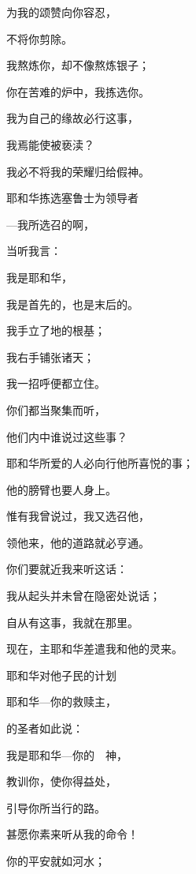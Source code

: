 {\par }{\Q 为我的颂赞向你容忍，
\par }{\Q 不将你剪除。
\par }{\Q {}我熬炼你，却不像熬炼银子；
\par }{\Q 你在苦难的炉中，我拣选你。
\par }{\Q {}我为自己的缘故必行这事，
\par }{\Q 我焉能使{}被亵渎？
\par }{\Q 我必不将我的荣耀归给假神。
\par }{\SH 耶和华拣选塞鲁士为领导者
\par }{\Q {}—我所选召的{}啊，
\par }{\Q 当听我言：
\par }{\Q 我是耶和华，
\par }{\Q 我是首先的，也是末后的。
\par }{\Q {}我手立了地的根基；
\par }{\Q 我右手铺张诸天；
\par }{\Q 我一招呼便都立住。
\par }{\BB \par }{\Q {}你们都当聚集而听，
\par }{\Q 他们内中谁说过这些事？
\par }{\Q 耶和华所爱的人必向{}行他所喜悦的事；
\par }{\Q 他的膀臂也要{}{}人身上。
\par }{\Q {}惟有我曾说过，我又选召他，
\par }{\Q 领他来，他的道路就必亨通。
\par }{\Q {}你们要就近我来听这话：
\par }{\Q 我从起头并未曾在隐密处说话；
\par }{\Q 自从有这事，我就在那里。
\par }{\Q 现在，主耶和华差遣我和他的灵来。
\par }{\SH 耶和华对他子民的计划
\par }{\Q {}耶和华—你的救赎主，
\par }{的圣者如此说：
\par }{\Q 我是耶和华—你的　神，
\par }{\Q 教训你，使你得益处，
\par }{\Q 引导你所当行的路。
\par }{\Q {}甚愿你素来听从我的命令！
\par }{\Q 你的平安就如河水；
}

